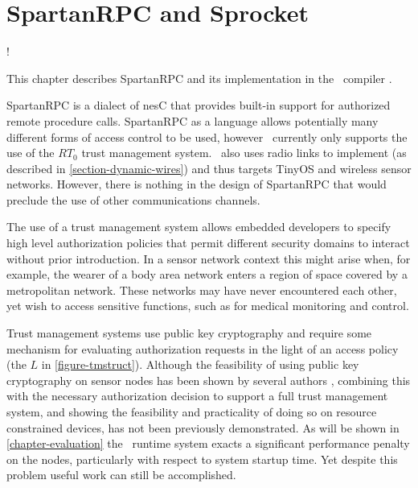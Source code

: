 
\chapter{SpartanRPC and Sprocket}
\label{chapter-spartanrpc-sprocket}

\lstset{language=nesC}
\lstMakeShortInline[basicstyle=\ttfamily]!

This chapter describes SpartanRPC \cite{chapin-skalka-SpartanRPC,chapin-skalka-SpartanRPCTR}
and its implementation in the \Sprocket\ compiler \cite{sprocket}.

SpartanRPC is a dialect of nesC that provides built-in support for authorized remote procedure
calls. SpartanRPC as a language allows potentially many different forms of access control to be
used, however \Sprocket\ currently only supports the use of the $RT_0$ trust management system.
\Sprocket\ also uses radio links to implement  (as described in
\autoref{section-dynamic-wires}) and thus targets TinyOS and wireless sensor networks. However,
there is nothing in the design of SpartanRPC that would preclude the use of other communications
channels.

The use of a trust management system allows embedded developers to specify high level
authorization policies that permit different security domains to interact without prior
introduction. In a sensor network context this might arise when, for example, the wearer of a
body area network enters a region of space covered by a metropolitan network. These networks may
have never encountered each other, yet wish to access sensitive functions, such as for medical
monitoring and control.

Trust management systems use public key cryptography and require some mechanism for evaluating
authorization requests in the light of an access policy (the $L$ in \autoref{figure-tmstruct}).
Although the feasibility of using public key cryptography on sensor nodes has been shown by
several authors
\cite{1049776,Malan:2008:IPI:1387663.1387668,bertoni-2006,kumar-2006,4604657,Liu-Peng-TinyECC-2008,Szczechowiak:2008:NTL:1786014.1786040},
combining this with the necessary authorization decision to support a full trust management
system, and showing the feasibility and practicality of doing so on resource constrained
devices, has not been previously demonstrated. As will be shown in \autoref{chapter-evaluation}
the \Sprocket\ runtime system exacts a significant performance penalty on the nodes,
particularly with respect to system startup time. Yet despite this problem useful work can still
be accomplished.

